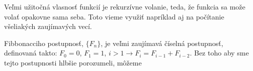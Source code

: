 \medskip

Veľmi užitočná vlasnosť funkcií je rekurzívne volanie, 
teda, že funkcia sa može volať opakovne sama seba. Toto vieme využiť napríklad
aj na počítanie všeliakých zaujímavých vecí. 

Fibbonacciho postupnosť, $\{F_n\}$,  je veľmi zaujímavá číselná postupnosť, definovaná takto:
$F_0 = 0$, $F_1 = 1$, $i>1 \rightarrow F_i = F_{i-1} + F_{i-2}$. Bez toho aby sme tejto postupnosti hlbšie
porozumeli, môžeme 


\begin{lstlisting}
\end{lstlisting}









